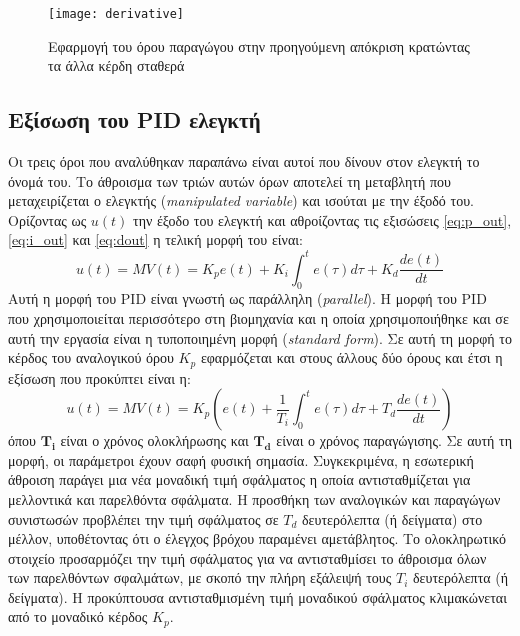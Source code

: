 \begin{figure}[h]
  \centering
  \texttt{[image: derivative]}
  \caption{Εφαρμογή του όρου παραγώγου στην προηγούμενη απόκριση κρατώντας τα άλλα κέρδη σταθερά}
  \label{fig:derivative}
\end{figure}

\subsection{Εξίσωση του PID ελεγκτή}

Οι τρεις όροι που αναλύθηκαν παραπάνω είναι αυτοί που δίνουν στον ελεγκτή το όνομά του. Το άθροισμα των τριών αυτών όρων αποτελεί τη μεταβλητή που μεταχειρίζεται ο ελεγκτής (\emph{manipulated variable}) και ισούται με την έξοδό του. Ορίζοντας ως $u(t)$ την έξοδο του ελεγκτή και αθροίζοντας τις εξισώσεις \ref{eq:p_out}, \ref{eq:i_out} και \ref{eq:dout} η τελική μορφή του είναι:
\begin{equation}
u(t)=MV(t)=K_p e(t) + K_i \int_{0}^{t} e(\tau)d\tau + K_d \frac{de(t)}{dt}
\label{eq:parallel_pid}
\end{equation}
Αυτή η μορφή του PID είναι γνωστή ως παράλληλη (\emph{parallel}). Η μορφή του PID που χρησιμοποιείται περισσότερο στη βιομηχανία και η οποία χρησιμοποιήθηκε και σε αυτή την εργασία είναι η τυποποιημένη μορφή (\emph{standard form}). Σε αυτή τη μορφή το κέρδος του αναλογικού όρου $K_p$ εφαρμόζεται και στους άλλους δύο όρους και έτσι η εξίσωση που προκύπτει είναι η:
\begin{equation}
u(t)=MV(t)=K_p \left( e(t) + \frac{1}{T_i}\int_{0}^{t} e(\tau)d\tau + T_d\frac{de(t)}{dt} \right)
\label{eq:standard_pid}
\end{equation}
όπου $\boldsymbol{T_i}$ είναι ο χρόνος ολοκλήρωσης και $\boldsymbol{T_d}$ είναι ο χρόνος παραγώγισης. Σε αυτή τη μορφή, οι παράμετροι έχουν σαφή φυσική σημασία. Συγκεκριμένα, η εσωτερική άθροιση παράγει μια νέα μοναδική τιμή σφάλματος η οποία αντισταθμίζεται για μελλοντικά και παρελθόντα σφάλματα. Η προσθήκη των αναλογικών και παραγώγων συνιστωσών προβλέπει την τιμή σφάλματος σε $T_d$ δευτερόλεπτα (ή δείγματα) στο μέλλον, υποθέτοντας ότι ο έλεγχος βρόχου παραμένει αμετάβλητος. Το ολοκληρωτικό στοιχείο προσαρμόζει την τιμή σφάλματος για να αντισταθμίσει το άθροισμα όλων των παρελθόντων σφαλμάτων, με σκοπό την πλήρη εξάλειψή τους $T_i$ δευτερόλεπτα (ή δείγματα). Η προκύπτουσα αντισταθμισμένη τιμή μοναδικού σφάλματος κλιμακώνεται από το μοναδικό κέρδος $K_p$.

